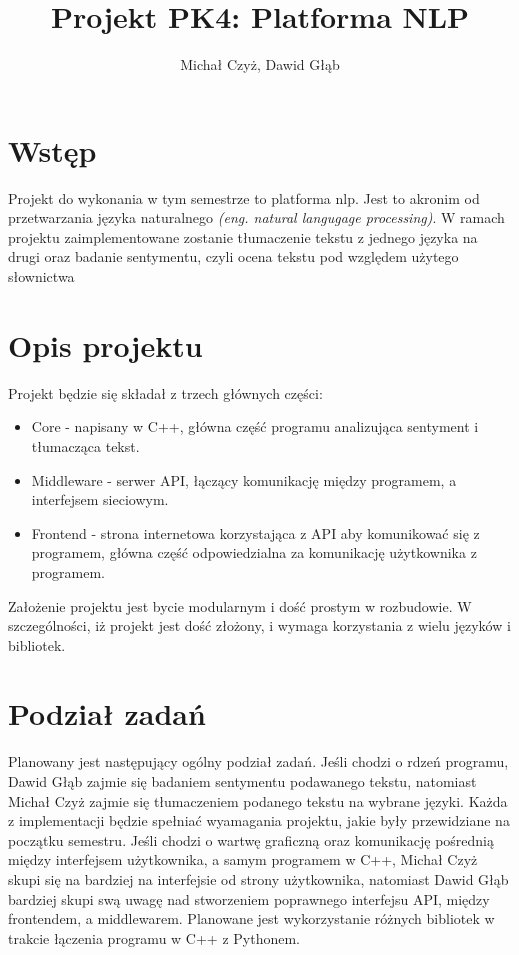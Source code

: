 \documentclass{article}
\title{Projekt PK4: Platforma NLP}
\author{Michał Czyż, Dawid Głąb}
\begin{document}
\maketitle

\section{Wstęp}

Projekt do wykonania w tym semestrze to platforma nlp. Jest to akronim od przetwarzania języka naturalnego \textit{(eng. natural langugage processing)}. W ramach projektu zaimplementowane zostanie tłumaczenie tekstu z jednego języka na drugi oraz badanie sentymentu, czyli ocena tekstu pod względem użytego słownictwa

\section{Opis projektu}

Projekt będzie się składał z trzech głównych części:

\begin{itemize}
  \item Core - napisany w C++, główna część programu analizująca sentyment i tłumacząca tekst.
  \item Middleware - serwer API, łączący komunikację między programem, a interfejsem sieciowym.
  \item Frontend - strona internetowa korzystająca z API aby komunikować się z programem, główna część odpowiedzialna za komunikację użytkownika z programem.
\end{itemize}

Założenie projektu jest bycie modularnym i dość prostym w rozbudowie. W szczególności, iż projekt jest dość złożony, i wymaga korzystania z wielu języków i bibliotek.

\section{Podział zadań}

Planowany jest następujący ogólny podział zadań. Jeśli chodzi o rdzeń programu, Dawid Głąb zajmie się badaniem sentymentu podawanego tekstu, natomiast Michał Czyż zajmie się tłumaczeniem podanego tekstu na wybrane języki. Każda z implementacji będzie spełniać wyamagania projektu, jakie były przewidziane na początku semestru. Jeśli chodzi o wartwę graficzną oraz komunikację pośrednią między interfejsem użytkownika, a samym programem w C++, Michał Czyż skupi się na bardziej na interfejsie od strony użytkownika, natomiast Dawid Głąb bardziej skupi swą uwagę nad stworzeniem poprawnego interfejsu API, między frontendem, a middlewarem. Planowane jest wykorzystanie różnych bibliotek w trakcie łączenia programu w C++ z Pythonem. 
\end{document}
